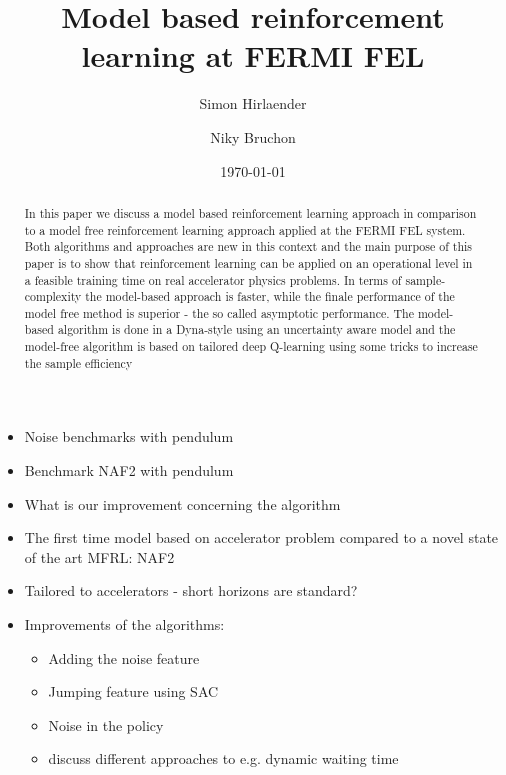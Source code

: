 \documentclass[
 reprint,
 amsmath,amssymb,amsfonts,clevref,
 aps,
prstab,
]{revtex4-2}
\begin{document}



\title{Model based reinforcement learning at FERMI FEL}



\author{Simon Hirlaender}
\author{Niky Bruchon}%

\date{\today}%


\begin{abstract}
In this paper we discuss a model based reinforcement learning approach in comparison to a model free reinforcement learning approach applied at the FERMI FEL system. Both algorithms and approaches are new in this context and the main purpose of this paper is to show that reinforcement learning can be applied on an operational level in a feasible training time on real accelerator physics problems. In terms of sample-complexity the model-based approach is faster, while the finale performance of the model free method is superior - the so called asymptotic performance. The model-based algorithm is done in a Dyna-style using an uncertainty aware model and the model-free algorithm is based on tailored deep Q-learning using some tricks to increase the sample efficiency
\end{abstract}
\maketitle
\begin{itemize}
	\item Noise benchmarks with pendulum
	\item Benchmark NAF2 with pendulum
	\item What is our improvement concerning the algorithm
	\item The first time model based on accelerator problem compared to a novel state of the art MFRL: NAF2
	\item Tailored to accelerators - short horizons are standard?
	\item Improvements of the algorithms:
	\begin{itemize}
		\item Adding the noise feature
		\item Jumping feature using SAC
		\item Noise in the policy
		\item discuss different approaches to e.g. dynamic waiting time
	\end{itemize}
\end{itemize}
\end{document}
